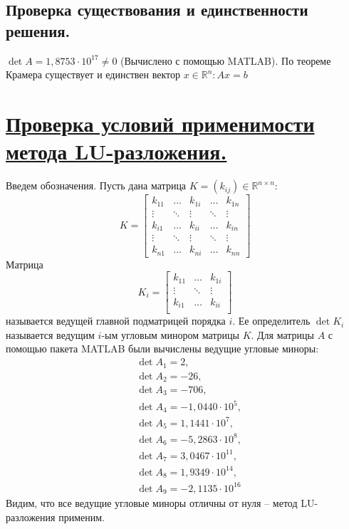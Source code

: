 \documentclass[a4paper, 12pt]{article}
\begin{document}
	\subsection{Проверка существования и единственности решения.}
	
	$\det A = 1,8753\cdot 10^{17} \neq 0$ (Вычислено с помощью MATLAB). По теореме Крамера существует и единствен вектор $x\in\mathbb{R}^n:Ax=b$
	
	\section{\underline{Проверка условий применимости метода LU-разложения.}}
	
	Введем обозначения. Пусть дана матрица $K=(k_{ij})\in\mathbb{R}^{n\times n}$:
	\begin{equation*}
		K=
		\begin{bmatrix}
			k_{11} & \dots & k_{1i} & \dots & k_{1n} \\
			\vdots & \ddots & \vdots & \ddots & \vdots \\
			k_{i1} & \dots & k_{ii} & \dots & k_{in} \\
			\vdots & \ddots & \vdots & \ddots & \vdots \\
			k_{n1} & \dots & k_{ni} & \dots & k_{nn}
		\end{bmatrix}
	\end{equation*}
	Матрица
	\begin{equation*}
		K_i=
		\begin{bmatrix}
			k_{11} & \dots & k_{1i} \\
			\vdots & \ddots & \vdots \\
			k_{i1} & \dots & k_{ii} \\
		\end{bmatrix}
	\end{equation*}
	называется ведущей главной подматрицей порядка $i$. Ее определитель $\det K_i$ называется ведущим $i$-ым угловым минором матрицы $K$. Для матрицы $A$ с помощью пакета MATLAB были вычислены ведущие угловые миноры:
	\begin{equation*}
		\begin{aligned}
			&\det A_1 = 2,\\
			&\det A_2 = -26,\\
			&\det A_3 = -706,\\
			&\det A_4 = -1,0440 \cdot 10^5,\\
			&\det A_5 = 1,1441 \cdot 10^7,\\
			&\det A_6 = -5,2863 \cdot 10^8, \\
			&\det A_7 = 3,0467 \cdot 10^{11}, \\
			&\det A_8 = 1,9349 \cdot 10^{14}, \\
			&\det A_9 = -2,1135 \cdot 10^{16}
		\end{aligned}
	\end{equation*}
	Видим, что все ведущие угловые миноры отличны от нуля -- метод LU-разложения применим.
	
\end{document}
